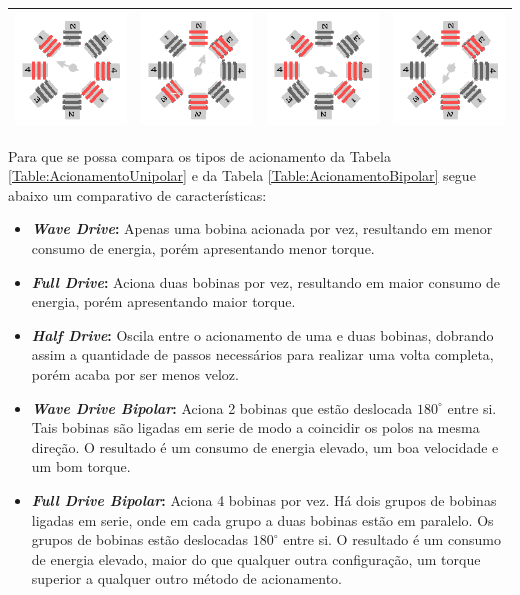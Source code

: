 \begin{table}[H]
\begin{tabular}{|cccc|}
		\includegraphics[width = 0.15\columnwidth]{Images/AcionamentoDoHSM/Bipolar/FullDrive/FullDriveI.png} & \includegraphics[width = 0.15\columnwidth]{Images/AcionamentoDoHSM/Bipolar/FullDrive/FullDriveII.png} & \includegraphics[width = 0.15\columnwidth]{Images/AcionamentoDoHSM/Bipolar/FullDrive/FullDriveIII.png} & \includegraphics[width = 0.15\columnwidth]{Images/AcionamentoDoHSM/Bipolar/FullDrive/FullDriveIV.png} \\
		\hline
	\end{tabular}
\end{table} 

Para que se possa compara os tipos de acionamento da Tabela \ref{Table:AcionamentoUnipolar} e da Tabela \ref{Table:AcionamentoBipolar} segue abaixo um comparativo de características:

\begin{itemize}
	\item \textbf{\textit{Wave Drive}:} Apenas uma bobina acionada por vez, resultando em  menor consumo de energia, porém apresentando menor torque.
	\item \textbf{\textit{Full Drive}:} Aciona duas bobinas por vez, resultando em  maior consumo de energia, porém apresentando maior torque.
	\item \textbf{\textit{Half Drive}:} Oscila entre o acionamento de uma e duas bobinas, dobrando assim a  quantidade de passos necessários para realizar uma volta completa, porém acaba por ser menos veloz.
	\item \textbf{\textit{Wave Drive Bipolar}:} Aciona 2 bobinas que estão deslocada $180^{\circ}$ entre si. Tais bobinas são ligadas em serie de modo a coincidir os polos na mesma direção. O resultado é um consumo de energia elevado, um boa velocidade e um bom torque.
	\item \textbf{\textit{Full Drive Bipolar}:} Aciona 4 bobinas por vez. Há dois grupos de bobinas ligadas em serie, onde em cada grupo a duas bobinas estão em paralelo. Os grupos de bobinas estão deslocadas $180^{\circ}$ entre si.  O resultado é um consumo de energia elevado, maior do que qualquer outra configuração,  um torque superior a qualquer outro método de acionamento.
\end{itemize}
